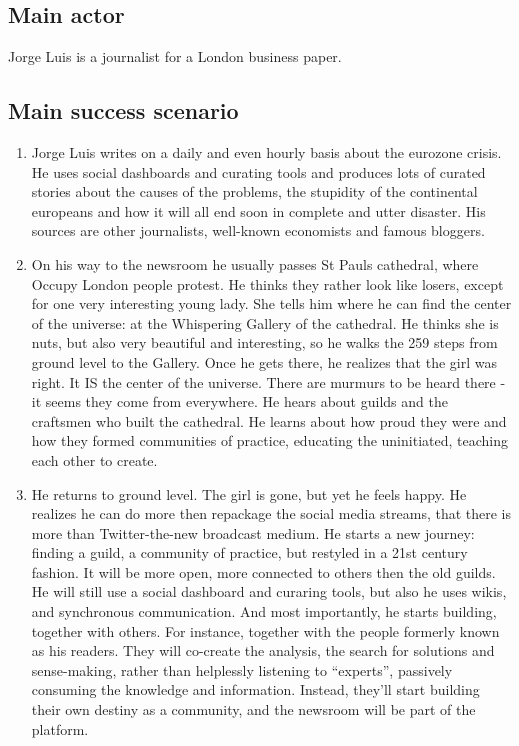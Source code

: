 \subsection{Main actor}

Jorge Luis is a journalist for a London business paper.

\subsection{Main success scenario}

\begin{enumerate}
\item
  Jorge Luis writes on a daily and even hourly basis about the eurozone
  crisis. He uses social dashboards and curating tools and produces lots
  of curated stories about the causes of the problems, the stupidity of
  the continental europeans and how it will all end soon in complete and
  utter disaster. His sources are other journalists, well-known
  economists and famous bloggers.
\item
  On his way to the newsroom he usually passes St Pauls cathedral, where
  Occupy London people protest. He thinks they rather look like losers,
  except for one very interesting young lady. She tells him where he can
  find the center of the universe: at the Whispering Gallery of the
  cathedral. He thinks she is nuts, but also very beautiful and
  interesting, so he walks the 259 steps from ground level to the
  Gallery. Once he gets there, he realizes that the girl was right. It
  IS the center of the universe. There are murmurs to be heard there -
  it seems they come from everywhere. He hears about guilds and the
  craftsmen who built the cathedral. He learns about how proud they were
  and how they formed communities of practice, educating the
  uninitiated, teaching each other to create.
\item
  He returns to ground level. The girl is gone, but yet he feels happy.
  He realizes he can do more then repackage the social media streams,
  that there is more than Twitter-the-new broadcast medium. He starts a
  new journey: finding a guild, a community of practice, but restyled in
  a 21st century fashion. It will be more open, more connected to others
  then the old guilds. He will still use a social dashboard and curaring
  tools, but also he uses wikis, and synchronous communication. And most
  importantly, he starts building, together with others. For instance,
  together with the people formerly known as his readers. They will
  co-create the analysis, the search for solutions and sense-making,
  rather than helplessly listening to ``experts'', passively consuming
  the knowledge and information. Instead, they'll start building their
  own destiny as a community, and the newsroom will be part of the
  platform.
\end{enumerate}
